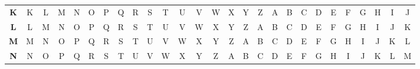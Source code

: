 \documentclass{article}
\begin{document}
\begin{latin}
\begin{table}[H]
{\begin{tabular}{ccccccccccccccccccccccccccc}
\multicolumn{1}{c|}{\textbf{K}} & \multicolumn{1}{c|}{K} & \multicolumn{1}{c|}{L} & \multicolumn{1}{c|}{M} & \multicolumn{1}{c|}{N} & \multicolumn{1}{c|}{O} & \multicolumn{1}{c|}{P} & \multicolumn{1}{c|}{Q} & \multicolumn{1}{c|}{R} & \multicolumn{1}{c|}{S} & \multicolumn{1}{c|}{T} & \multicolumn{1}{c|}{U} & \multicolumn{1}{c|}{V} & \multicolumn{1}{c|}{W} & \multicolumn{1}{c|}{X} & \multicolumn{1}{c|}{Y} & \multicolumn{1}{c|}{Z} & \multicolumn{1}{c|}{A} & \multicolumn{1}{c|}{B} & \multicolumn{1}{c|}{C} & \multicolumn{1}{c|}{D} & \multicolumn{1}{c|}{E} & \multicolumn{1}{c|}{F} & \multicolumn{1}{c|}{G} & \multicolumn{1}{c|}{H} & \multicolumn{1}{c|}{I} & \multicolumn{1}{c|}{J} \\ \cline{2-27} 
\multicolumn{1}{c|}{\textbf{L}} & \multicolumn{1}{c|}{L} & \multicolumn{1}{c|}{M} & \multicolumn{1}{c|}{N} & \multicolumn{1}{c|}{O} & \multicolumn{1}{c|}{P} & \multicolumn{1}{c|}{Q} & \multicolumn{1}{c|}{R} & \multicolumn{1}{c|}{S} & \multicolumn{1}{c|}{T} & \multicolumn{1}{c|}{U} & \multicolumn{1}{c|}{V} & \multicolumn{1}{c|}{W} & \multicolumn{1}{c|}{X} & \multicolumn{1}{c|}{Y} & \multicolumn{1}{c|}{Z} & \multicolumn{1}{c|}{A} & \multicolumn{1}{c|}{B} & \multicolumn{1}{c|}{C} & \multicolumn{1}{c|}{D} & \multicolumn{1}{c|}{E} & \multicolumn{1}{c|}{F} & \multicolumn{1}{c|}{G} & \multicolumn{1}{c|}{H} & \multicolumn{1}{c|}{I} & \multicolumn{1}{c|}{J} & \multicolumn{1}{c|}{K} \\ \cline{2-27} 
\multicolumn{1}{c|}{\textbf{M}} & \multicolumn{1}{c|}{M} & \multicolumn{1}{c|}{N} & \multicolumn{1}{c|}{O} & \multicolumn{1}{c|}{P} & \multicolumn{1}{c|}{Q} & \multicolumn{1}{c|}{R} & \multicolumn{1}{c|}{S} & \multicolumn{1}{c|}{T} & \multicolumn{1}{c|}{U} & \multicolumn{1}{c|}{V} & \multicolumn{1}{c|}{W} & \multicolumn{1}{c|}{X} & \multicolumn{1}{c|}{Y} & \multicolumn{1}{c|}{Z} & \multicolumn{1}{c|}{A} & \multicolumn{1}{c|}{B} & \multicolumn{1}{c|}{C} & \multicolumn{1}{c|}{D} & \multicolumn{1}{c|}{E} & \multicolumn{1}{c|}{F} & \multicolumn{1}{c|}{G} & \multicolumn{1}{c|}{H} & \multicolumn{1}{c|}{I} & \multicolumn{1}{c|}{J} & \multicolumn{1}{c|}{K} & \multicolumn{1}{c|}{L} \\ \cline{2-27} 
\multicolumn{1}{c|}{\textbf{N}} & \multicolumn{1}{c|}{N} & \multicolumn{1}{c|}{O} & \multicolumn{1}{c|}{P} & \multicolumn{1}{c|}{Q} & \multicolumn{1}{c|}{R} & \multicolumn{1}{c|}{S} & \multicolumn{1}{c|}{T} & \multicolumn{1}{c|}{U} & \multicolumn{1}{c|}{V} & \multicolumn{1}{c|}{W} & \multicolumn{1}{c|}{X} & \multicolumn{1}{c|}{Y} & \multicolumn{1}{c|}{Z} & \multicolumn{1}{c|}{A} & \multicolumn{1}{c|}{B} & \multicolumn{1}{c|}{C} & \multicolumn{1}{c|}{D} & \multicolumn{1}{c|}{E} & \multicolumn{1}{c|}{F} & \multicolumn{1}{c|}{G} & \multicolumn{1}{c|}{H} & \multicolumn{1}{c|}{I} & \multicolumn{1}{c|}{J} & \multicolumn{1}{c|}{K} & \multicolumn{1}{c|}{L} & \multicolumn{1}{c|}{M} \\ \cline{2-27} 

\end{tabular}}
\end{table}
\end{latin}
\end{document}
